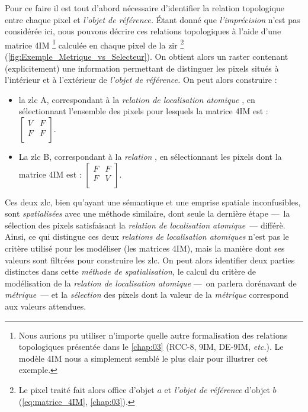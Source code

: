 Pour ce faire il est tout d'abord nécessaire d'identifier la relation topologique entre chaque pixel et \emph{l'objet de référence.} Étant donné que \emph{l'imprécision} n'est pas considérée ici, nous pouvons décrire ces relations topologiques à l'aide d'une matrice 4IM \footnote{Nous aurions pu utiliser n'importe quelle autre formalisation des relations topologiques présentée dans le \autoref{chap:03} (RCC-8, 9IM, DE-9IM, \emph{etc.}). Le modèle 4IM nous a simplement semblé le plus clair pour illustrer cet exemple.} calculée en chaque pixel de la \ac{zir} \footnote{Le pixel traité fait alors office d'objet \(a\) et \emph{l'objet de référence} d'objet \(b\) (\autoref{eq:matrice_4IM}, \autoref{chap:03}).} (\autoref{fig:Exemple_Metrique_vs_Selecteur}). On obtient alors un raster contenant (explicitement) une information permettant de distinguer les pixels situés à l'intérieur et à l'extérieur de \emph{l'objet de référence.} On peut alors construire :
% 
\begin{itemize}
\item la \ac{zlc} \textcolor{RdBu-9-1}{A}, correspondant à la \emph{relation de localisation atomique} , en sélectionnant l'ensemble des pixels pour lesquels la matrice 4IM est : \(\left[\begin{smallmatrix}V&F\\F&F\\\end{smallmatrix}\right]\).
\item La \ac{zlc} \textcolor{RdBu-9-9}{B}, correspondant à la \emph{relation} , en sélectionnant les pixels dont la matrice 4IM est : \(\left[\begin{smallmatrix}F&F\\F&V\\\end{smallmatrix}\right]\).
\end{itemize}
%
Ces deux \ac{zlc}, bien qu'ayant une sémantique et une emprise spatiale inconfusibles, sont \emph{spatialisées} avec une méthode similaire, dont seule la dernière étape ---~la sélection des pixels satisfaisant la \emph{relation de localisation atomique}~--- différè.
Ainsi, ce qui distingue ces deux \emph{relations de localisation atomiques} n'est pas le critère utilisé pour les modéliser (\ie les matrices 4IM), mais la manière dont ses valeurs sont filtrées pour construire les \ac{zlc}. On peut alors identifier deux parties distinctes dans cette \emph{méthode de spatialisation,} le calcul du critère de modélisation de la \emph{relation de localisation atomique} ---~on parlera dorénavant de \emph{métrique}~--- et la \emph{sélection} des pixels dont la valeur de la \emph{métrique} correspond aux valeurs attendues.

